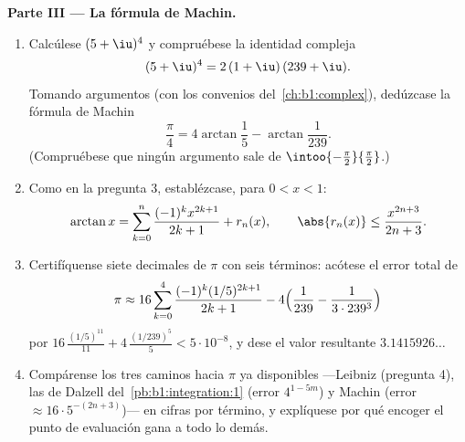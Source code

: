 \begin{problem}
\medskip
\noindent\textbf{Parte III --- La fórmula de Machin.}
\begin{enumerate}[resume]
  \item Calcúlese $(5 + \iu)^4$ y compruébese la identidad compleja
        \[
        (5 + \iu)^4 = 2\,(1 + \iu)\,(239 + \iu) .
        \]
        Tomando argumentos (con los convenios
        del~\cref{ch:b1:complex}), dedúzcase la fórmula de Machin
        \[
        \frac\pi4 = 4\arctan\frac15 - \arctan\frac{1}{239} .
        \]
        (Compruébese que ningún argumento sale de
        $\intoo{-\frac\pi2}{\frac\pi2}$.)
  \item Como en la pregunta 3, establézcase, para $0 < x < 1$:
        \[
        \arctan x = \sum_{k=0}^{n} \frac{(-1)^k
        x^{2k+1}}{2k+1} + r_n(x), \qquad \abs{r_n(x)} \leq
        \frac{x^{2n+3}}{2n+3} .
        \]
  \item Certifíquense siete decimales de $\pi$ con seis términos:
        acótese el error total de
        \[
        \pi \approx 16\sum_{k=0}^{4}
        \frac{(-1)^k (1/5)^{2k+1}}{2k+1}
        - 4\Bigl(\frac{1}{239} - \frac{1}{3\cdot239^3}\Bigr)
        \]
        por $16\,\frac{(1/5)^{11}}{11} + 4\,\frac{(1/239)^5}{5} <
        5\cdot10^{-8}$, y dese el valor resultante
        $3.1415926\dots$
  \item Compárense los tres caminos hacia $\pi$ ya disponibles
        ---Leibniz (pregunta 4), las  de Dalzell
        del~\cref{pb:b1:integration:1} (error $4^{1-5m}$) y Machin
        (error $\approx 16\cdot 5^{-(2n+3)}$)--- en cifras por
        término, y explíquese por qué encoger el punto de evaluación
        gana a todo lo demás.
\end{enumerate}


\end{problem}
